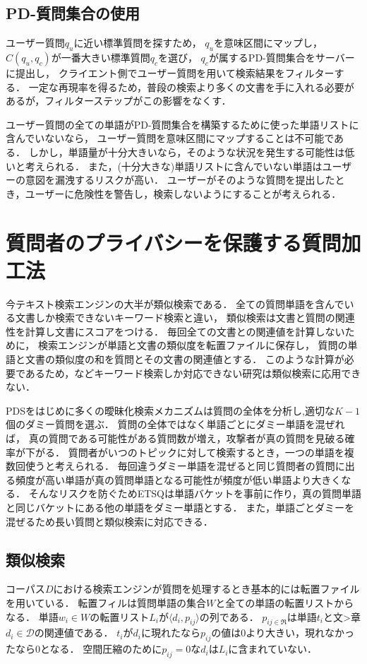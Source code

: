 \documentclass[master]{suribt}
\theoremstyle{definition}
\begin{document}
 \subsection{PD-質問集合の使用}
 ユーザー質問$q_u$に近い標準質問を探すため，
 $q_u$を意味区間にマップし，
 $C(q_u,q_c)$が一番大きい標準質問$q_c$を選び，
 $q_c$が属するPD-質問集合をサーバーに提出し，
 クライエント側でユーザー質問を用いて検索結果をフィルターする．
 一定な再現率を得るため，普段の検索より多くの文書を手に入れる必要があるが，フィルターステップがこの影響をなくす．

 ユーザー質問の全ての単語がPD-質問集合を構築するために使った単語リストに含んでいないなら，
 ユーザー質問を意味区間にマップすることは不可能である．
 しかし，単語量が十分大きいなら，そのような状況を発生する可能性は低いと考えられる．
 また，(十分大きな)単語リストに含んでいない単語はユーザーの意図を漏洩するリスクが高い．
 ユーザーがそのような質問を提出したとき，ユーザーに危険性を警告し，検索しないようにすることが考えられる．

 \section{質問者のプライバシーを保護する質問加工法} \label{s:ETSQ}
 今テキスト検索エンジンの大半が類似検索である．
 全ての質問単語を含んでいる文書しか検索できないキーワード検索と違い，
 類似検索は文書と質問の関連性を計算し文書にスコアをつける\cite{if2006}．
 毎回全ての文書との関連値を計算しないために，
 検索エンジンが単語と文書の類似度を転置ファイルに保存し，
 質問の単語と文書の類似度の和を質問とその文書の関連値とする．
 このような計算が必要であるため，\cite{pss2006,opf2005,pke2004,soe2000}などキーワード検索しか対応できない研究は類似検索に応用できない．

 PDSをはじめに多くの曖昧化検索メカニズム\cite{masking2014,praw2005,goo2009}は質問の全体を分析し,適切な$K−1$個のダミー質問を選ぶ．
 質問の全体ではなく単語ごとにダミー単語を混ぜれば，
 真の質問である可能性がある質問数が増え，攻撃者が真の質問を見破る確率が下がる．
 質問者がいつのトピックに対して検索するとき，一つの単語を複数回使うと考えられる．
 毎回違うダミー単語を混ぜると同じ質問者の質問に出る頻度が高い単語が真の質問単語となる可能性が頻度が低い単語より大きくなる．
 そんなリスクを防ぐためETSQは単語バケットを事前に作り，真の質問単語と同じバケットにある他の単語をダミー単語とする．
 また，単語ごとダミーを混ぜるため長い質問と類似検索に対応できる．

 \subsection{類似検索}
 コーパス$D$における検索エンジンが質問を処理するとき基本的には転置ファイルを用いている．
 転置フィルは質問単語の集合$W$と全ての単語の転置リストからなる．
 単語$w_i \in W$の転置リスト$L_i$が$\langle d_i,p_{ij}\rangle$の列である．
 $p_{ij \in \Re}$は単語$t_i$と文>章$d_i \in \mathcal{D}$の関連値である．
 $t_i$が$d_i$に現れたなら$p_{ij}$の値は$0$より大きい，現れなかったなら$0$となる．
 空間圧縮のために$p_{ij}=0$な$d_i$は$L_i$に含まれていない．
\end{document}
